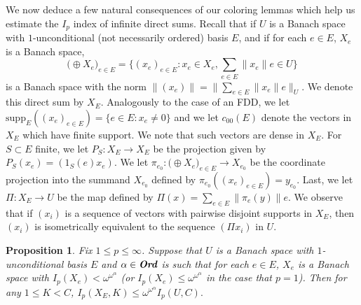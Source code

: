 \documentclass[12pt]{amsart}
\newtheorem{proposition}[theorem]{Proposition}
\theoremstyle{definition}
\newcommand{\ord}{\textbf{Ord}}
\newcommand{\supp}{\mathrm{supp}}
\begin{document}
We now deduce a few natural consequences of our coloring lemmas which help us estimate the $I_p$ index of infinite direct sums.  Recall that if $U$ is a Banach space with $1$-unconditional (not necessarily ordered) basis $E$, and if for each $e\in E$, $X_e$ is a Banach space, $$\bigl(\oplus X_e\bigr)_{e\in E}=\{(x_e)_{e\in E}: x_e\in X_e, \sum_{e\in E} \|x_e\|e\in U\}$$ is a Banach space with the norm $\|(x_e)\|= \|\sum_{e\in E}\|x_e\|e\|_U$.  We denote this direct sum by $X_E$.  Analogously to the case of an FDD, we let $\supp_E((x_e)_{e\in E})=\{e\in E: x_e\neq 0\}$ and we let $c_{00}(E)$ denote the vectors in $X_E$ which have finite support.  We note that such vectors are dense in $X_E$.  For $S\subset E$ finite, we let $P_S:X_E\to X_E$ be the projection given by $P_S(x_e)= (1_S(e) x_e)$.  We let $\pi_{e_0}:\bigl(\oplus X_e\bigr)_{e\in E}\to X_{e_0}$ be the coordinate projection into the summand $X_{e_0}$ defined by $\pi_{e_0}((x_e)_{e\in E})= y_{e_0}$.  Last, we let $\Pi:X_E\to U$ be the map defined by $\Pi(x)=\sum_{e\in E} \|\pi_e(y)\|e$.  We observe that if $(x_i)$ is a sequence of vectors with pairwise disjoint supports in $X_E$, then $(x_i)$ is isometrically equivalent to the sequence $(\Pi x_i)$ in $U$.  

\begin{proposition}

Fix $1\leqslant p\leqslant \infty$.  Suppose that $U$ is a Banach space with $1$-unconditional basis $E$ and $\alpha\in \emph{\ord}$ is such that for each $e\in E$, $X_e$ is a Banach space with $I_p(X_e)< \omega^{\omega^\alpha}$ (or $I_p(X_e)\leqslant \omega^{\omega^\alpha}$ in the case that $p=1$).  Then for any $1\leqslant K<C$, $I_p(X_E, K) \leqslant \omega^{\omega^\alpha}I_p(U, C).$  

\label{infinite direct sum}

\end{proposition}
\end{document}
